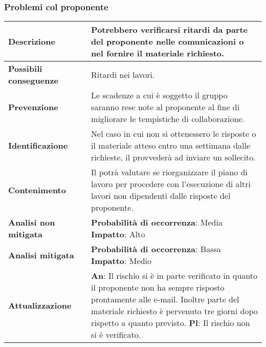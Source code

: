 	\newpage
		\subsubsection {Problemi col proponente}
		\label{subsec:pbmProponente}
		
		
					\small
					\begin{table}[H]
					\begin{center}			
					\begin{tabular}{p{2.5cm}p{0.5cm}p{11cm}}
					\arrayrulecolor{lightgray}
					
					\toprule				
						\textbf{Descrizione}
						& &
						Potrebbero verificarsi ritardi da parte del proponente nelle comunicazioni o nel fornire il materiale richiesto.
					\\
					\midrule
						\textbf{Possibili \newline conseguenze}
						& &
						Ritardi nei lavori.
					\\
					\midrule
						\textbf{Prevenzione}
						& &
						Le scadenze a cui è soggetto il gruppo saranno rese note al proponente al fine di migliorare le tempistiche di collaborazione.
					\\
					\midrule
						\textbf{Identificazione}
						& &
						Nel caso in cui non si ottenessero le risposte o il materiale atteso entro una settimana dalle richieste, il \responsabilediprogetto{} provvederà ad inviare un sollecito.
					\\
					\midrule
						\textbf{Contenimento}
						& &
						 Il \responsabilediprogetto{} potrà valutare se riorganizzare il piano di lavoro per procedere con l'esecuzione di altri lavori non dipendenti dalle risposte del proponente.
					\\
					\midrule
						\textbf{Analisi \newline non mitigata}
						& &
						\textbf{Probabilità di occorrenza}: Media
						\newline
						\textbf{Impatto}: Alto
					\\
					\midrule
						\textbf{Analisi \newline mitigata}
						& &
						\textbf{Probabilità di occorrenza}: Bassa
						\newline
						\textbf{Impatto}: Medio
					\\
					\midrule
						\textbf{Attualizzazione}
						& &
						\textbf{An}: Il rischio si è in parte verificato in quanto il proponente non ha sempre risposto prontamente alle e-mail. Inoltre parte del materiale richiesto è pervenuto tre giorni dopo rispetto a quanto previsto.
						\newline
						\textbf{Pl}: Il rischio non si è verificato.
					\\
					
					\bottomrule	
					\end{tabular}
					\end{center}
					\end{table}			
	
